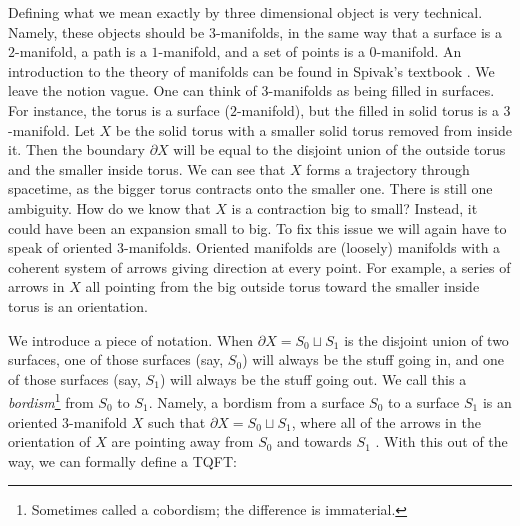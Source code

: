 \documentclass{article}
\theoremstyle{definition}
\numberwithin{figure}{section}
\begin{document}
Defining what we mean exactly by three dimensional object is very technical. Namely, these objects should be $3$-manifolds, in the same way that a surface is a $2$-manifold, a path is a $1$-manifold, and a set of points is a $0$-manifold. An introduction to the theory of manifolds can be found in Spivak's textbook \cite{spivak2018calculus}. We leave the notion vague. One can think of 3-manifolds as being filled in surfaces. For instance, the torus is a surface ($2$-manifold), but the filled in solid torus is a $3$-manifold. Let $X$ be the solid torus with a smaller solid torus removed from inside it. Then the boundary $\partial X$ will be equal to the disjoint union of the outside torus and the smaller inside torus. We can see that $X$ forms a trajectory through spacetime, as the bigger torus contracts onto the smaller one. There is still one ambiguity. How do we know that $X$ is a contraction big to small? Instead, it could have been an expansion small to big. To fix this issue we will again have to speak of oriented $3$-manifolds. Oriented manifolds are (loosely) manifolds with a coherent system of arrows giving direction at every point. For example, a series of arrows in $X$ all pointing from the big outside torus toward the smaller inside torus is an orientation.

We introduce a piece of notation. When $\partial X = S_0 \sqcup S_1$ is the disjoint union of two surfaces, one of those surfaces (say, $S_0$) will always be the stuff going in, and one of those surfaces (say, $S_1$) will always be the stuff going out. We call this a \textit{bordism}\footnote{Sometimes called a cobordism; the difference is immaterial.} from $S_0$ to $S_1$. Namely, a bordism from a surface $S_0$ to a surface $S_1$ is an oriented $3$-manifold $X$ such that $\partial X = S_0\sqcup S_1$, where all of the arrows in the orientation of $X$ are pointing away from $S_0$ and towards $S_1$ . With this out of the way, we can formally define a TQFT:
\end{document}
